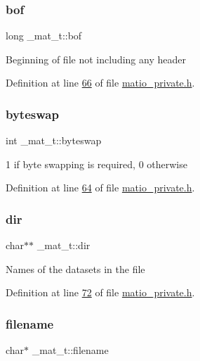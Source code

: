 \subsubsection{\texorpdfstring{bof}{bof}}
{\footnotesize\ttfamily long \+\_\+mat\+\_\+t\+::bof}

Beginning of file not including any header 

Definition at line \hyperlink{matio__private_8h_source_l00066}{66} of file \hyperlink{matio__private_8h_source}{matio\+\_\+private.\+h}.

\mbox{\label{struct__mat__t_a99d207977af5e04941ace56d71817a40}} 
\subsubsection{\texorpdfstring{byteswap}{byteswap}}
{\footnotesize\ttfamily int \+\_\+mat\+\_\+t\+::byteswap}

1 if byte swapping is required, 0 otherwise 

Definition at line \hyperlink{matio__private_8h_source_l00064}{64} of file \hyperlink{matio__private_8h_source}{matio\+\_\+private.\+h}.

\mbox{\label{struct__mat__t_a1bc6c604459d0787801d5e53d365684c}} 
\subsubsection{\texorpdfstring{dir}{dir}}
{\footnotesize\ttfamily char$\ast$$\ast$ \+\_\+mat\+\_\+t\+::dir}

Names of the datasets in the file 

Definition at line \hyperlink{matio__private_8h_source_l00072}{72} of file \hyperlink{matio__private_8h_source}{matio\+\_\+private.\+h}.

\mbox{\label{struct__mat__t_a340b191598135edd03b6dec847f0b1b1}} 
\subsubsection{\texorpdfstring{filename}{filename}}
{\footnotesize\ttfamily char$\ast$ \+\_\+mat\+\_\+t\+::filename}

